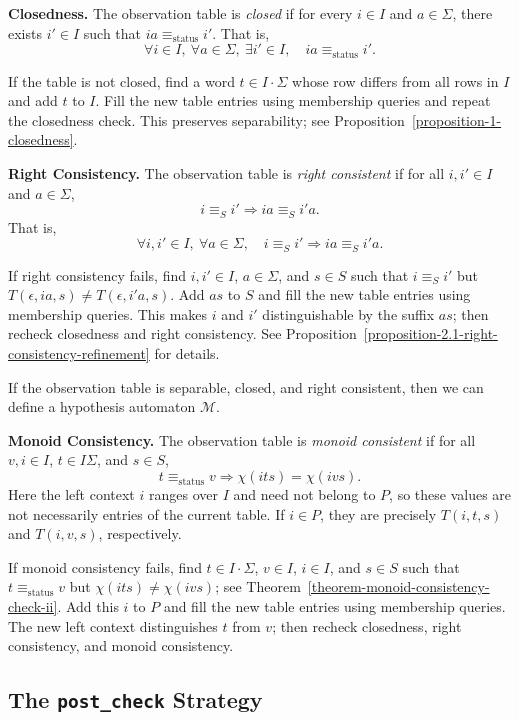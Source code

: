 \documentclass{ieice-tecrep}
\begin{document}
\textbf{Closedness.}
The observation table is \emph{closed} if for every \(i \in I\) and \(a\in \Sigma\),
there exists \(i'\in I\) such that \(ia \equiv_{\mathrm{status}} i'\).
That is,
\[
\forall i \in I,\ \forall a \in \Sigma,\ \exists i' \in I,\quad
ia \equiv_{\mathrm{status}} i'.
\]

If the table is not closed, find a word
\(t \in I\cdot\Sigma\) whose row differs from all rows in \(I\)
and add \(t\) to \(I\). Fill the new table entries using membership
queries and repeat the closedness check. This preserves separability;
see Proposition~\ref{proposition-1-closedness}.

\textbf{Right Consistency.}
The observation table is \emph{right consistent} if for all \(i,i'\in I\) and \(a\in \Sigma\),
\[
i \equiv_S i'
\Longrightarrow
ia \equiv_S i'a.
\]
That is,
\[
\forall i,i' \in I,\ \forall a \in \Sigma,\quad
i \equiv_S i' \Longrightarrow ia \equiv_S i'a.
\]

If right consistency fails, find \(i,i'\in I\),
\(a\in\Sigma\), and \(s\in S\) such that \(i\equiv_S i'\) but
\(T(\epsilon,ia,s)\neq T(\epsilon,i'a,s)\). Add \(as\) to \(S\)
and fill the new table entries using membership queries. This makes
\(i\) and \(i'\) distinguishable by the suffix \(as\); then recheck
closedness and right consistency. See Proposition~\ref{proposition-2.1-right-consistency-refinement} for details.

If the observation table is separable, closed, and right consistent, then we can
define a hypothesis automaton \(\mathcal{M}\).

\textbf{Monoid Consistency.}
The observation table is \emph{monoid consistent} if for all \(v,i\in I\), \(t\in I\Sigma\), and \(s\in S\),
\[
t\equiv_{\mathrm{status}}v\Longrightarrow \chi(its)=\chi(ivs).
\]
Here the left context \(i\) ranges over \(I\) and need not belong
to \(P\), so these values are not necessarily entries of the current
table. If \(i\in P\), they are precisely \(T(i,t,s)\) and
\(T(i,v,s)\), respectively.

If monoid consistency fails, find
\(t\in I\cdot\Sigma\), \(v\in I\), \(i\in I\), and \(s\in S\)
such that \(t\equiv_{\mathrm{status}}v\) but
\(\chi(its)\neq \chi(ivs)\); see Theorem~\ref{theorem-monoid-consistency-check-ii}.
Add this \(i\) to \(P\) and fill the new table entries using membership
queries. The new left context distinguishes \(t\) from \(v\);
then recheck closedness, right consistency, and monoid consistency.

\subsection{The \texttt{post\_check} Strategy}\label{strategy-post-check}
\end{document}

